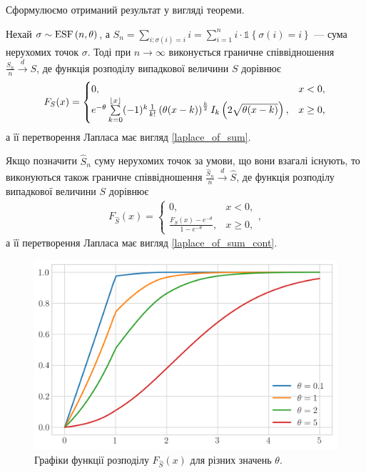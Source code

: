 Сформулюємо отриманий результат у вигляді теореми.
\begin{theorem}
    Нехай $\sigma \sim \ESF{n, \theta}$, а 
    $S_n = \sum_{i : \sigma(i) = i} i = \sum_{i=1}^n i \cdot \mathds{1}\left\{\sigma(i) = i \right\}$ --- сума нерухомих точок $\sigma$.
    Тоді при $n\to\infty$ виконується граничне
    співвідношення
    $\frac{S_n}{n} \overset{d}{\longrightarrow} S$,
    де функція розподілу випадкової величини $S$ дорівнює
    \begin{gather}
        F_{S}(x) = \begin{cases}
            0, & x < 0, \\
            e^{-\theta}
            \sum\limits_{k=0}^{\floor*{x}}
            (-1)^k \frac{1}{k!}\left(\theta(x-k)\right)^{\frac{k}{2}} I_k\left(2\sqrt{\theta(x-k)}\right), & x \geq 0,
        \end{cases}
    \end{gather}
    а її перетворення Лапласа має вигляд \eqref{laplace_of_sum}.
    
    Якщо позначити $\widehat{S}_n$ суму нерухомих точок за умови,
    що вони взагалі існують, то виконуються також граничне співвідношення
    $\frac{\widehat{S}_n}{n} \overset{d}{\longrightarrow} \widehat{S}$,
    де функція розподілу випадкової величини $S$ дорівнює
    \begin{gather}
        F_{\widehat{S}}(x) = \begin{cases}
            0, & x < 0, \\
            \frac{F_{S}(x) - e^{-\theta}}{1 - e^{-\theta}}, & x \geq 0,
        \end{cases},
    \end{gather}
    а її перетворення Лапласа має вигляд \eqref{laplace_of_sum_cont}.
    \begin{figure}[H]
        \centering
        \includegraphics[scale=0.65]{plots/cdf_sum_hat.png}
        \caption{Графіки функції розподілу $F_{\widehat{S}}(x)$ для різних значень $\theta$.}
    \end{figure}
\end{theorem}

